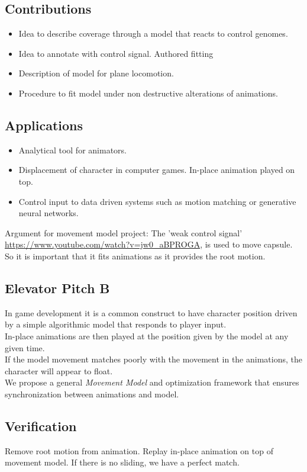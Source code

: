 \documentclass[format=acmtog]{acmart}
\begin{document}
\subsection{Contributions}
\begin{itemize}
    \item Idea to describe coverage through a model that reacts to control genomes.
    \item Idea to annotate with control signal. Authored fitting
    \item Description of model for plane locomotion.
    \item Procedure to fit model under non destructive alterations of animations.
\end{itemize}
\subsection{Applications}
\begin{itemize}
    \item Analytical tool for animators.
    \item Displacement of character in computer games. In-place animation played on top.
    \item Control input to data driven systems such as motion matching or generative neural networks.
\end{itemize}


Argument for movement model project: The 'weak control signal' \url{https://www.youtube.com/watch?v=jw0_aBPROGA}, is used to move capsule. So it is important that it fits animations as it provides the root motion.


\subsection{Elevator Pitch B}
In game development it is a common construct to have character position driven by a simple algorithmic model that responds to player input.
\\ 
In-place animations are then played at the position given by the model at any given time.
\\
If the model movement matches poorly with the movement in the animations, the character will appear to float.
\\
We propose a general \textit{Movement Model} and optimization framework that ensures synchronization between animations and model. 

\subsection{Verification}
Remove root motion from animation. Replay in-place animation on top of movement model. If there is no sliding, we have a perfect match.









{}

\end{document}
